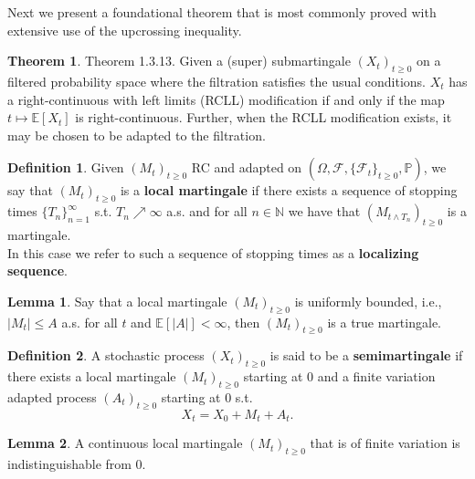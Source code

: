\documentclass[12pt]{article}
\newcommand{\cF}{\mathcal{F}}
\newcommand{\E}{\mathbb{E}}
\newcommand{\N}{\mathbb{N}}
\newcommand{\Prb}{\mathbb{P}}
\newcommand{\cFPS}{(\Omega, \cF, \{ \cF_t\}_{t \geq 0}, \Prb)}
\theoremstyle{definition}
\newtheorem{defn}{Definition}
\newtheorem{thm}{Theorem}
\newtheorem{lemma}{Lemma}
\begin{document}
Next we present a foundational theorem that is most commonly proved with extensive use of the upcrossing inequality.
\begin{thm} \cite{karatzas1991} Theorem 1.3.13.
    Given a (super) submartingale $(X_t)_{t \geq 0}$ on a filtered probability space where the filtration satisfies the usual conditions.
    $X_t$ has a right-continuous with left limits (RCLL) modification if and only if the map $t \mapsto \E[X_t]$ is right-continuous.
    Further, when the RCLL modification exists, it may be chosen to be adapted to the filtration.
\end{thm}


\begin{defn}
    Given $(M_t)_{t \geq 0}$ RC and adapted on $\cFPS$, we say that $(M_t)_{t \geq 0}$ is a \textbf{local martingale}
    if there exists a sequence of stopping times $\{T_n\}_{n =1}^\infty$ s.t. $T_n \nearrow \infty$ a.s.
    and for all $n \in \N$ we have that $(M_{t \wedge T_n})_{t \geq 0}$ is a martingale. \\
    In this case we refer to such a sequence of stopping times as a \textbf{localizing sequence}.
\end{defn}

\begin{lemma} \cite{protter2005} %
    Say that a local martingale $(M_t)_{t \geq 0}$ is uniformly bounded, i.e., $|M_t| \leq A$ a.s. for all $t$ and $\E[|A|] < \infty$,
    then $(M_t)_{t \geq 0}$ is a true martingale.
\end{lemma}

\begin{defn}
    A stochastic process $(X_t)_{t \geq 0}$ is said to be a \textbf{semimartingale} if there exists a local martingale $(M_t)_{t \geq 0}$ starting at 0 and a finite variation adapted process $(A_t)_{t \geq 0}$ starting at 0 s.t.
    \[
        X_t = X_0 + M_t + A_t.
    \]
\end{defn}

\begin{lemma} \cite{revuz1990} %
    A continuous local martingale $(M_t)_{t \geq 0}$ that is of finite variation is indistinguishable from 0. \\
\end{lemma}
\end{document}
